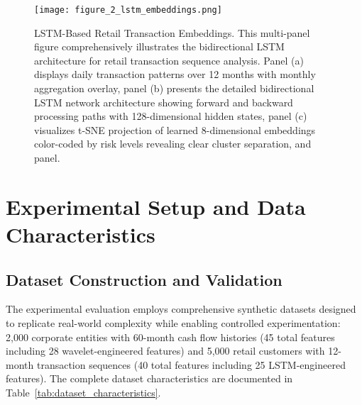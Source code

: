 \documentclass[a4paper,11pt,twoside]{article}
\newcommand{\0}{\Bf{0}}
\theoremstyle{definition}
\begin{document}
\begin{figure}
\centering
\texttt{[image: figure\_2\_lstm\_embeddings.png]}
\caption{LSTM-Based Retail Transaction Embeddings. This multi-panel figure comprehensively illustrates the bidirectional LSTM architecture for retail transaction sequence analysis. Panel (a) displays daily transaction patterns over 12 months with monthly aggregation overlay, panel (b) presents the detailed bidirectional LSTM network architecture showing forward and backward processing paths with 128-dimensional hidden states, panel (c) visualizes t-SNE projection of learned 8-dimensional embeddings color-coded by risk levels revealing clear cluster separation, and panel.}
\label{fig:lstm_embeddings}
\end{figure}
\section{Experimental Setup and Data Characteristics}

\subsection{Dataset Construction and Validation}

The experimental evaluation employs comprehensive synthetic datasets designed to replicate real-world complexity while enabling controlled experimentation: 2,000 corporate entities with 60-month cash flow histories (45 total features including 28 wavelet-engineered features) and 5,000 retail customers with 12-month transaction sequences (40 total features including 25 LSTM-engineered features). The complete dataset characteristics are documented in Table~\ref{tab:dataset_characteristics}.
\end{document}

